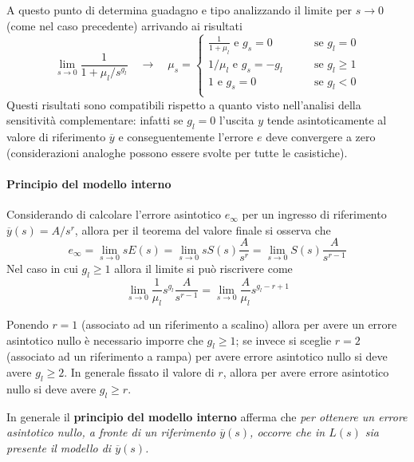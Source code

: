 		A questo punto di determina guadagno e tipo analizzando il limite per $s\rightarrow 0$ (come nel caso precedente) arrivando ai risultati
		\[ \lim_{s\rightarrow 0} \frac{1}{ 1 + \mu_l / s^{g_l}} \quad \rightarrow \quad \mu_s = \begin{cases}
			\frac{1}{1 + \mu_l} \textrm{ e } g_s = 0 \qquad & \textrm{se } g_l = 0 \\
			 1/\mu_l \textrm{ e } g_s = - g_l \qquad & \textrm{se } g_l \geq 1 \\ 
			 1 \textrm{ e } g_s = 0  \qquad & \textrm{se } g_l < 0 \\ 
		\end{cases}  \]
		Questi risultati sono compatibili rispetto a quanto visto nell'analisi della sensitività complementare: infatti se $g_l = 0$ l'uscita $y$ tende asintoticamente al valore di riferimento $\overline y$ e conseguentemente l'errore $e$ deve convergere a zero (considerazioni analoghe possono essere svolte per tutte le casistiche).
		
		\paragraph{Principio del modello interno} Considerando di calcolare l'errore asintotico $e_\infty$ per un ingresso di riferimento $\overline y(s) = A / s^r$, allora per il teorema del valore finale si osserva che
		\[ e_\infty = \lim_{s\rightarrow 0} sE(s) = \lim_{s\rightarrow 0} s S(s) \frac A{s^r}  = \lim_{s\rightarrow 0} S(s) \frac A{s^{r-1}} \]
		Nel caso in cui $g_l \geq 1$ allora il limite si può riscrivere come
		\[ \lim_{s\rightarrow 0} \frac 1  {\mu_l} s^{g_l} \frac A {s^{r-1}} = \lim_{s\rightarrow 0} \frac A {\mu_l} s^{g_l - r + 1} \]
		
		Ponendo $r=1$ (associato ad un riferimento a scalino) allora per avere un errore asintotico nullo è necessario imporre che $g_l \geq 1$; se invece si sceglie $r=2$ (associato ad un riferimento a rampa) per avere errore asintotico nullo si deve avere $g_l \geq 2$. In generale fissato il valore di $r$, allora per avere errore asintotico nullo si deve avere $g_l \geq r$.
		
		In generale il \textbf{principio del modello interno} afferma che \textit{per ottenere un errore asintotico nullo, a fronte di un riferimento $\overline y(s)$, occorre che in $L(s)$ sia presente il modello di $\overline y(s)$.}
		
